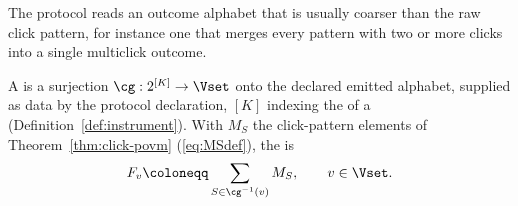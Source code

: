 
The protocol reads an outcome alphabet that is usually coarser than the raw
click pattern, for instance one that merges every pattern with two or more
clicks into a single multiclick outcome.

\begin{definition}\label{def:coarse}
A  is a surjection
$\cg:2^{[K]}\to\Vset$ onto the declared emitted alphabet, supplied as data by
the protocol declaration, $[K]$ indexing the  of a
 (Definition~\ref{def:instrument}). With $M_S$ the click-pattern elements of
Theorem~\ref{thm:click-povm} (\eqref{eq:MSdef}), the  is
\begin{equation}\label{eq:coarse}
  F_v\coloneqq\sum_{S\in\cg^{-1}(v)}M_S ,\qquad v\in\Vset .
\end{equation}
\end{definition}
